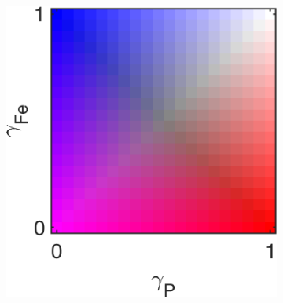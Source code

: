 \documentclass{article}
\begin{document}
\begin{figure}[htbp]
\begin{subfigure}{.33\textwidth}
\end{subfigure}
\begin{subfigure}{.25\textwidth}
\includegraphics[width=0.95\linewidth]{../Separate_figures/ECOGEM/SizeClass_Limitation_clrbar.png}
\end{subfigure}
\end{figure}
\end{document}
